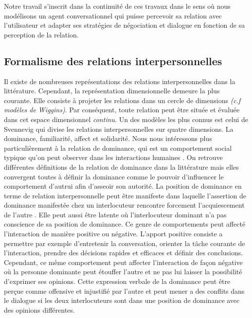 \documentclass [french]{sig-alternate-05-2015}
\begin{document}
\par Notre travail s'inscrit dans la continuité de ces travaux dans le sens où nous modélisons un agent conversationnel qui puisse percevoir sa relation avec l'utilisateur et adapter ses stratégies de négociation et dialogue en fonction de sa perception de la relation. 

\subsection{Formalisme des relations interpersonnelles}
\label{RI}
 Il existe de nombreuses représentations des relations interpersonnelles dans la littérature. Cependant, la représentation dimensionnelle demeure la plus courante. Elle consiste à projeter les relations dans un cercle de dimensions \emph{(c.f modèles de Wiggins)}. Par conséquent, toute relation peut être située et évaluée dans cet espace dimensionnel \textit{continu}. Un des modèles les plus connus est celui de Svennevig \cite{svennevig2000getting} qui divise les relations interpersonnelles sur quatre dimensions. La dominance, familiarité, affect et solidarité. Nous nous intéressons plus particulièrement à la relation de dominance, qui est un comportement social typique qu'on peut observer dans les interactions humaines \cite{dunbar2005perceptions}. On retrouve différentes définitions de la relation de dominance dans la littérature mais elles convergent toutes à définir la dominance comme le pouvoir d'influencer le comportement d'autrui afin d'asseoir son autorité. La position de dominance en terme de relation interpersonnelle peut être manifeste \cite{dunbar2005perceptions} dans laquelle l'assertion de dominance manifestée chez un interlocuteur rencontre forcement  l'acquiescement de l'autre \cite{rogers1979domineeringness}. Elle peut aussi être latente \cite{komter1989hidden} où l'interlocuteur dominant n'a pas conscience de sa position de dominance. Ce genre de comportements peut affecté l'interaction de manière positive ou négative. L'apport positive consiste a permettre par exemple d'entretenir la conversation, orienter la tâche courante de l’interaction, prendre des décisions rapides et efficaces et définir des conclusions. Cependant, ce même comportement peut affecter l’interaction de façon négative où la personne dominante peut étouffer l'autre et ne pas lui laisser la possibilité d'exprimer ses opinions. Cette expression verbale de la dominance peut être perçue comme offensive et injustifié par l'autre et peut mener a des conflits dans le dialogue si les deux interlocuteurs sont dans une position de dominance avec des opinions différentes.
\end{document}
